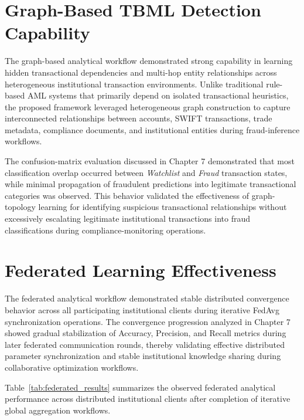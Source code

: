 \section[Graph-Based TBML Detection Capability]
{\textbf{Graph-Based TBML Detection Capability}}

The graph-based analytical workflow demonstrated strong capability in learning hidden transactional dependencies and multi-hop entity relationships across heterogeneous institutional transaction environments. Unlike traditional rule-based AML systems that primarily depend on isolated transactional heuristics, the proposed framework leveraged heterogeneous graph construction to capture interconnected relationships between accounts, SWIFT transactions, trade metadata, compliance documents, and institutional entities during fraud-inference workflows.

The confusion-matrix evaluation discussed in Chapter 7 demonstrated that most classification overlap occurred between \textit{Watchlist} and \textit{Fraud} transaction states, while minimal propagation of fraudulent predictions into legitimate transactional categories was observed. This behavior validated the effectiveness of graph-topology learning for identifying suspicious transactional relationships without excessively escalating legitimate institutional transactions into fraud classifications during compliance-monitoring operations.

\section[Federated Learning Effectiveness]
{\textbf{Federated Learning Effectiveness}}

The federated analytical workflow demonstrated stable distributed convergence behavior across all participating institutional clients during iterative FedAvg synchronization operations. The convergence progression analyzed in Chapter 7 showed gradual stabilization of Accuracy, Precision, and Recall metrics during later federated communication rounds, thereby validating effective distributed parameter synchronization and stable institutional knowledge sharing during collaborative optimization workflows.

Table~\ref{tab:federated_results} summarizes the observed federated analytical performance across distributed institutional clients after completion of iterative global aggregation workflows.

